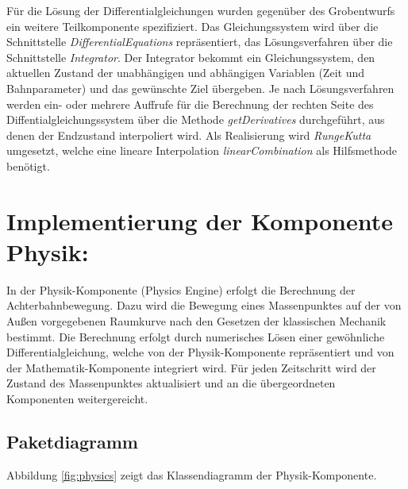 Für die Lösung der Differentialgleichungen wurden gegenüber des Grobentwurfs ein
weitere Teilkomponente spezifiziert. Das Gleichungssystem wird über die Schnittstelle
\emph{DifferentialEquations} repräsentiert, das Lösungsverfahren über die Schnittstelle
\emph{Integrator}. Der Integrator bekommt ein Gleichungssystem, den aktuellen Zustand
der unabhängigen und abhängigen Variablen (Zeit und Bahnparameter) und das gewünschte
Ziel übergeben. Je nach Lösungsverfahren werden ein- oder mehrere Auffrufe für die
Berechnung der rechten Seite des Diffentialgleichungssystem über die Methode 
\emph{getDerivatives} durchgeführt, aus denen der Endzustand interpoliert wird.
Als Realisierung wird \emph{RungeKutta} umgesetzt, welche eine lineare Interpolation
\emph{linearCombination} als Hilfsmethode benötigt.

\section{Implementierung der Komponente Physik:}

In der Physik-Komponente (Physics Engine) erfolgt die Berechnung der Achterbahnbewegung.
Dazu wird die Bewegung eines Massenpunktes auf der von Außen vorgegebenen Raumkurve
nach den Gesetzen der klassischen Mechanik bestimmt. Die Berechnung erfolgt
durch numerisches Lösen einer gewöhnliche Differentialgleichung, welche von der
Physik-Komponente repräsentiert und von der Mathematik-Komponente integriert wird.
Für jeden Zeitschritt wird der Zustand des Massenpunktes aktualisiert und an die
übergeordneten Komponenten weitergereicht.

\subsection{Paketdiagramm}
Abbildung \ref{fig:physics} zeigt das Klassendiagramm der Physik-Komponente.

